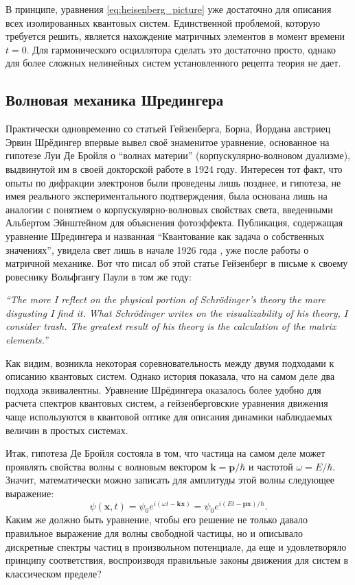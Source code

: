 \documentclass[14pt, a4paper]{extreport}
\numberwithin{equation}{section}
\begin{document}
В принципе, уравнения \eqref{eq:heisenberg_picture} уже достаточно для описания всех изолированных квантовых систем. Единственной проблемой, которую требуется решить, является нахождение матричных элементов в момент времени $t=0$. Для гармонического осциллятора сделать это достаточно просто, однако для более сложных нелинейных систем установленного рецепта теория не дает.

\subsection{Волновая механика Шредингера}


Практически одновременно со статьей Гейзенберга, Борна, Йордана австриец Эрвин Шрёдингер впервые вывел своё знаменитое уравнение, основанное на гипотезе Луи Де Бройля о ``волнах материи'' (корпускулярно-волновом дуализме), выдвинутой им в своей докторской работе в 1924 году. Интересен тот факт, что опыты по дифракции электронов были проведены лишь позднее, и гипотеза, не имея реального экспериментального подтверждения, была основана лишь на аналогии с понятием о корпускулярно-волновых свойствах света, введенными Альбертом Эйнштейном для объяснения фотоэффекта. Публикация, содержащая уравнение Шредингера и названная ``Квантование как задача о собственных значениях'', увидела свет лишь в начале 1926 года \cite{schrodinger2003collected}, уже после работы о матричной механике. Вот что писал об этой статье Гейзенберг в письме к своему ровеснику Вольфгангу Паули в том же году: 

\begin{center}
\begin{minipage}{0.9\textwidth}
\textit{``The more I reflect on the physical portion of Schrödinger's theory the more disgusting I find it. What Schrödinger writes on the visualizability of his theory, I consider trash. The greatest result of his theory is the calculation of the matrix elements.''}
\end{minipage}
\end{center}
Как видим, возникла некоторая соревновательность между двумя подходами к описанию квантовых систем. Однако история показала, что на самом деле два подхода эквивалентны. Уравнение Шрёдингера оказалось более удобно для расчета спектров квантовых систем, а гейзенберговские уравнения движения чаще используются в квантовой оптике для описания динамики наблюдаемых величин в простых системах.

Итак, гипотеза Де Бройля состояла в том, что частица на самом деле может проявлять свойства волны с волновым вектором $\mathbf{k} = \mathbf{p}/\hbar$ и частотой $\omega = E/\hbar$. Значит, математически можно записать для амплитуды этой волны следующее выражение:
\begin{equation}
	\psi (\mathbf{x},t) = \psi_0 e^{i(\omega t - \mathbf{k} \mathbf{x})} = \psi_0 e^{i(E t - \mathbf{p} \mathbf{x})/\hbar}. \label{eq:psi}
\end{equation}
Каким же должно быть уравнение, чтобы его решение не только давало правильное выражение для волны свободной частицы, но и описывало дискретные спектры частиц в произвольном потенциале, да еще и удовлетворяло принципу соответствия, воспроизводя правильные законы движения для систем в классическом пределе?
\end{document}
